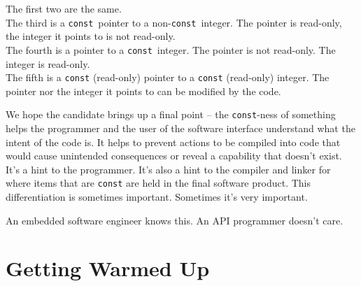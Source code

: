 \documentclass[12pt]{article}
\newcommand{\cconst}{{\texttt{const}}}%
\begin{document}
\begin{enumerate}
The first two are the same.\\
The third is a \cconst\ pointer to a non-\cconst\ integer.
The pointer is read-only, the integer it points to is not read-only.\\
The fourth is a pointer to a \cconst\ integer.  The pointer
is not read-only.  The integer is read-only.\\
The fifth is a {\texttt{const}} (read-only) pointer to a {\texttt{const}}
(read-only) integer.  The pointer nor the integer it points to can be
modified by the code.

We hope the candidate brings up a final point -- the {\texttt{const}}-ness of
something helps the programmer and the user of the software interface understand
what the intent of the code is.  It helps to prevent actions to be compiled into
code that would cause unintended consequences or reveal a capability that doesn't
exist.  It's a hint to the programmer.  It's also a hint to the compiler and
linker for where items that are {\texttt{const}} are held in the final 
software product.  This differentiation is sometimes important.  Sometimes
it's very important.

An embedded software engineer knows this.  An API programmer doesn't care.
\end{enumerate}

\section{Getting Warmed Up}
\end{document}
